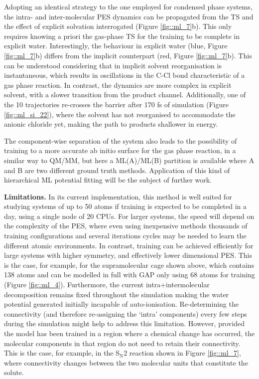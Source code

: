 \documentclass[../../main.tex]{subfiles}
\begin{document}
Adopting an identical strategy to the one employed for condensed phase systems, the intra- and inter-molecular PES dynamics can be propagated from the TS and the effect of explicit solvation interrogated (Figure \ref{fig::ml_7}b). This only requires knowing a priori the gas-phase TS for the training to be complete in explicit water. Interestingly, the behaviour in explicit water (blue, Figure \ref{fig::ml_7}b) differs from the implicit counterpart (red, Figure \ref{fig::ml_7}b). This can be understood considering that in implicit solvent reorganisation is instantaneous, which results in oscillations in the C-Cl bond characteristic of a gas phase reaction. In contrast, the dynamics are more complex in explicit solvent, with a slower transition from the product channel. Additionally, one of the 10 trajectories re-crosses the barrier after 170 fs of simulation (Figure \ref{fig::ml_si_22}), where the solvent has not reorganised to accommodate the anionic chloride yet, making the path to products shallower in energy.

The component-wise separation of the system also leads to the possibility of training to a more accurate ab initio surface for the gas phase reaction, in a similar way to QM/MM, but here a ML(A)/ML(B) partition is available where A and B are two different ground truth methods. Application of this kind of hierarchical ML potential fitting will be the subject of further work.


{\bfseries{Limitations.}} In its current implementation, this method is well suited for studying systems of up to 50 atoms if training is expected to be completed in a day, using a single node of 20 CPUs. For larger systems, the speed will depend on the complexity of the PES, where even using inexpensive methods thousands of training configurations and several iterations cycles may be needed to learn the different atomic environments. In contrast, training can be achieved efficiently for large systems with higher symmetry, and effectively lower dimensional PES. This is the case, for example, for the supramolecular cage shown above, which contains 138 atoms and can be modelled in full with GAP only using 68 atoms for training (Figure \ref{fig::ml_4}). Furthermore, the current intra+intermolecular decomposition remains fixed throughout the simulation making the water potential generated initially incapable of auto-ionisation. Re-determining the connectivity (and therefore re-assigning the `intra' components) every few steps during the simulation might help to address this limitation. However, provided the model has been trained in a region where a chemical change has occurred, the molecular components in that region do not need to retain their connectivity. This is the case, for example, in the S${}_\text{N}$2 reaction shown in Figure \ref{fig::ml_7}, where connectivity changes between the two molecular units that constitute the solute.
\end{document}
